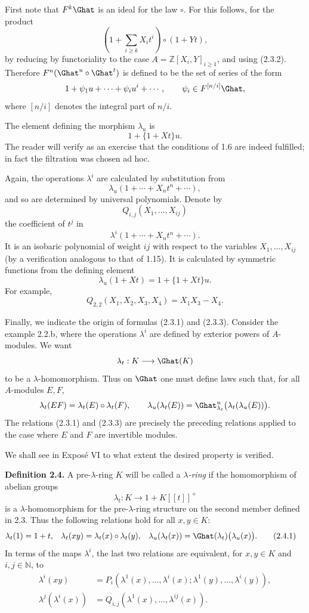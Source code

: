 First note that \(F^k\Ghat\) is an ideal for the law \(\circ\). For this follows, for the product
\[
  \left(1+\sum_{i\geq k}X_i t^i\right)\circ(1+Yt),
\]
by reducing by functoriality to the case \(A=\mathbb Z[X_i,Y]_{i\geq 1}\), and using (2.3.2). Therefore \(F^n(\Ghat^u\circ\Ghat^t)\) is defined to be the set of series of the form
\[
  1+\psi_1u+\cdots+\psi_iu^i+\cdots,\qquad
  \psi_i\in F^{[n/i]}\Ghat,
\]
where \([n/i]\) denotes the integral part of \(n/i\).

The element defining the morphism \(\lambda_u\) is
\[
  1+\{1+Xt\}u.
\]
The reader will verify as an exercise that the conditions of 1.6 are indeed fulfilled; in fact the filtration was chosen ad hoc.

Again, the operations \(\lambda^i\) are calculated by substitution from
\[
  \lambda_u(1+\cdots+X_nt^n+\cdots),
\]
and so are determined by universal polynomials. Denote by
\[
  Q_{i,j}(X_1,\ldots,X_{ij})
\]
the coefficient of \(t^j\) in
\[
  \lambda^i(1+\cdots+X_nt^n+\cdots).
\]
It is an isobaric polynomial of weight \(ij\) with respect to the variables \(X_1,\ldots,X_{ij}\) (by a verification analogous to that of 1.15). It is calculated by symmetric functions from the defining element
\begin{equation}\tag{2.3.3}
  \lambda_u(1+Xt)=1+\{1+Xt\}u .
\end{equation}
For example,
\[
  Q_{2,2}(X_1,X_2,X_3,X_4)=X_1X_3-X_4.
\]

Finally, we indicate the origin of formulas (2.3.1) and (2.3.3). Consider the example 2.2.b, where the operations \(\lambda^i\) are defined by exterior powers of \(A\)-modules. We want
\[
  \lambda_t:K\longrightarrow \Ghat(K)
\]
to be a \(\lambda\)-homomorphism. Thus on \(\Ghat\) one must define laws such that, for all \(A\)-modules \(E,F\),
\[
  \lambda_t(EF)=\lambda_t(E)\circ\lambda_t(F),\qquad
  \lambda_u(\lambda_t(E))=\Ghat^u_{\lambda_t}\bigl(\lambda_t(\lambda_u(E))\bigr).
\]
The relations (2.3.1) and (2.3.3) are precisely the preceding relations applied to the case where \(E\) and \(F\) are invertible modules.

We shall see in Exposé VI to what extent the desired property is verified.

\textbf{Definition 2.4.} A pre-\(\lambda\)-ring \(K\) will be called a \emph{\(\lambda\)-ring} if the homomorphism of abelian groups
\[
  \lambda_t:K\longrightarrow 1+K[[t]]^+
\]
is a \(\lambda\)-homomorphism for the pre-\(\lambda\)-ring structure on the second member defined in 2.3. Thus the following relations hold for all \(x,y\in K\):
\begin{align}
  \lambda_t(1)&=1+t,&
  \lambda_t(xy)&=\lambda_t(x)\circ\lambda_t(y),&
  \lambda_u(\lambda_t(x))&=\Ghat(\lambda_t)\bigl(\lambda_u(x)\bigr).
  \tag{2.4.1}
\end{align}
In terms of the maps \(\lambda^i\), the last two relations are equivalent, for \(x,y\in K\) and \(i,j\in\mathbb N\), to
\begin{align}
  \lambda^i(xy)
  &=P_i(\lambda^1(x),\ldots,\lambda^i(x);
       \lambda^1(y),\ldots,\lambda^i(y)), \tag{2.4.2}\\
  \lambda^j(\lambda^i(x))
  &=Q_{i,j}(\lambda^1(x),\ldots,\lambda^{ij}(x)). \tag{2.4.3}
\end{align}

